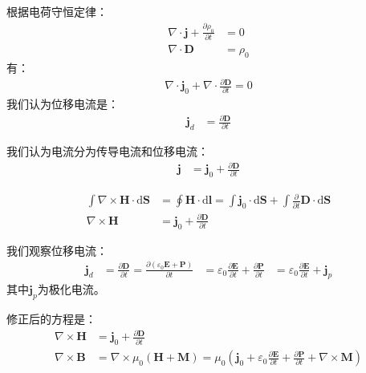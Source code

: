 \documentclass[12pt,onecolumn,a4paper]{book}
\numberwithin{table}{subsection}
\numberwithin{equation}{subsection}
\begin{document}
    根据电荷守恒定律：
    \begin{align}
        \nabla \cdot \mathbf{j} + \frac{\partial \rho_0}{\partial t} & = 0      \\
        \nabla \cdot \mathbf{D}                                      & = \rho_0
    \end{align}
    有：
    \begin{align}
        \nabla \cdot \mathbf{j}_0                                  + \nabla \cdot \frac{\partial \mathbf{D}}{\partial t} = 0
    \end{align}
    我们认为位移电流是：
    \begin{align}
        \mathbf{j}_d & = \frac{\partial \mathbf{D}}{\partial t}
    \end{align}

    我们认为电流分为传导电流和位移电流：
    \begin{align}
        \mathbf{j} & = \mathbf{j}_0 + \frac{\partial \mathbf{D}}{\partial t}
    \end{align}

    \begin{align}
        \int \nabla \times \mathbf{H} \cdot \mathrm{d} \mathbf{S} & = \oint \mathbf{H} \cdot \mathrm{d} \mathbf{l} = \int \mathbf{j}_0 \cdot \mathrm{d} \mathbf{S} + \int \frac{\partial}{\partial t}  \mathbf{D} \cdot \mathrm{d} \mathbf{S} \\
        \nabla \times \mathbf{H}                                  & = \mathbf{j}_0 + \frac{\partial \mathbf{D}}{\partial t}
    \end{align}

    我们观察位移电流：
    \begin{align}
        \mathbf{j}_d & = \frac{\partial \mathbf{D}}{\partial t} = \frac{\partial (\varepsilon_0 \mathbf{E} + \mathbf{P})}{\partial t}
                     & = \varepsilon_0 \frac{\partial \mathbf{E}}{\partial t} + \frac{\partial \mathbf{P}}{\partial t}
                     & = \varepsilon_0 \frac{\partial \mathbf{E}}{\partial t} + \mathbf{j}_p
    \end{align}
    其中$\mathbf{j}_p$为极化电流。

    修正后的方程是：
    \begin{align}
        \nabla \times \mathbf{H} & = \mathbf{j}_0 + \frac{\partial \mathbf{D}}{\partial t}                                                                                                                                        \\
        \nabla \times \mathbf{B} & =\nabla \times \mu_0(\mathbf{H} + \mathbf{M}) = \mu_0 (\mathbf{j}_0 + \varepsilon_0 \frac{\partial \mathbf{E}}{\partial t} + \frac{\partial \mathbf{P}}{\partial t} + \nabla \times\mathbf{M})
    \end{align}
\end{document}
